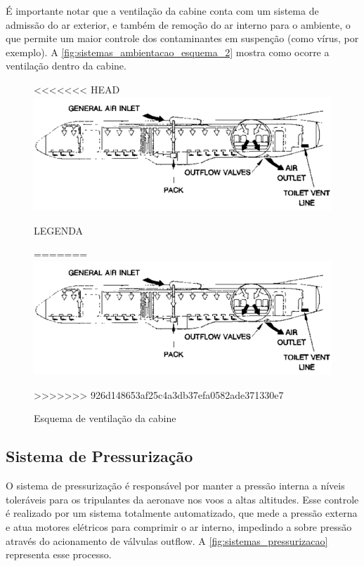 É importante notar que a ventilação da cabine conta com um sistema de admissão do ar exterior, e também de remoção do ar interno para o ambiente, o que permite um maior controle dos contaminantes em suspenção (como vírus, por exemplo).
A \autoref{fig:sistemas_ambientacao_esquema_2} mostra como ocorre a ventilação dentro da cabine.

\begin{figure}
<<<<<<< HEAD
\centering
\includegraphics{images/parte3/sistemas_ambientacao_esquema_2.png}
\caption{LEGENDA}
=======
\includegraphics[width=\textwidth]{images/parte3/sistemas_ambientacao_esquema_2.png}
\caption{Esquema de ventilação da cabine}
>>>>>>> 926d148653af25c4a3db37efa0582ade371330e7
\label{fig:sistemas_ambientacao_esquema_2}
\end{figure}

\subsection{Sistema de Pressurização}

O sistema de pressurização é responsável por manter a pressão interna a níveis toleráveis para os tripulantes da aeronave nos voos a altas altitudes.
Esse controle é realizado por um sistema totalmente automatizado, que mede a pressão externa e atua motores elétricos para comprimir o ar interno, impedindo a sobre pressão através do acionamento de válvulas outflow.
A \autoref{fig:sistemas_pressurizacao} representa esse processo.


